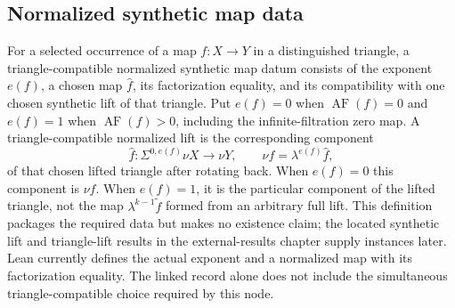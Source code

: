 \subsection{Normalized synthetic map data}

\begin{definition}
  \label{def:synthetic-hat-map}
  \notready
  For a selected occurrence of a map $f:X\to Y$ in a distinguished triangle,
  a triangle-compatible normalized synthetic map datum consists of the
  exponent $e(f)$, a chosen map $\widehat f$, its factorization equality, and
  its compatibility with one chosen synthetic lift of that triangle.  Put
  $e(f)=0$ when
  $\operatorname{AF}(f)=0$ and $e(f)=1$ when
  $\operatorname{AF}(f)>0$, including the infinite-filtration zero map.  A
  triangle-compatible normalized lift is the corresponding component
  \[
    \widehat f:\Sigma^{0,e(f)}\nu X\longrightarrow\nu Y,
    \qquad \nu f=\lambda^{e(f)}\widehat f,
  \]
  of that chosen lifted triangle after rotating back.  When $e(f)=0$
  this component is $\nu f$.  When $e(f)=1$, it is the particular component of
  the lifted triangle, not the map $\lambda^{k-1}\widetilde f$ formed from an
  arbitrary full lift.  This definition packages the required data but makes
  no existence claim; the located synthetic lift and triangle-lift results in
  the external-results chapter supply instances later.
  Lean currently defines the actual exponent and a normalized map with
  its factorization equality. The linked record alone does not include
  the simultaneous triangle-compatible choice required by this node.
\end{definition}

